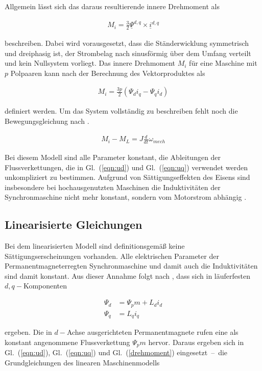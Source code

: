 \documentclass[conference,twocolumn]{IEEEtran}
\begin{document}
Allgemein lässt sich das daraus resultierende innere Drehmoment als

\begin{align}
M_i = \frac{3}{2} \underline{\Psi}^{d,q} \times \underline{i}^{d,q} \label{drehmoment}
\end{align}

beschreiben.
Dabei wird vorausgesetzt, dass die Ständerwicklung symmetrisch und dreiphasig ist, der Strombelag nach \textcite{ternesfeldkamp} sinusförmig über dem Umfang verteilt und kein Nullsystem vorliegt.
Das innere Drehmoment $M_i$ für eine Maschine mit $p$ Polpaaren kann nach der Berechnung des Vektorproduktes als

\begin{align}
M_i = \frac{3p}{2}(\Psi_d i_q - \Psi_q i_d)
\end{align}

definiert werden.
Um das System vollständig zu beschreiben fehlt noch die Bewegungsgleichung nach \textcite{mullerI2005}.

\begin{align}
M_i - M_L = J \frac{d}{dt} \omega_{mech} \label{bewegungsgleichung}
\end{align}

Bei diesem Modell sind alle Parameter konstant, die Ableitungen der Flussverkettungen, die in Gl.~(\ref{eqn:ud}) und Gl.~(\ref{eqn:uq}) verwendet werden unkompliziert zu bestimmen.
Aufgrund von Sättigungseffekten des Eisens sind insbesondere bei hochausgenutzten Maschinen die Induktivitäten der Synchronmaschine nicht mehr konstant, sondern vom Motorstrom abhängig \autocite{Kellner2012}.

\subsection{Linearisierte Gleichungen}\label{sec:lin-gleichungen}

Bei dem linearisierten Modell sind definitionsgemäß \autocite{mullerII2008} keine Sättigungserscheinungen vorhanden.
Alle elektrischen Parameter der Permanentmagneterregten Synchronmaschine und damit auch die Induktivitäten sind damit konstant.
Aus dieser Annahme folgt nach \textcite{ternesfeldkamp}, dass sich in läuferfesten $d, q-$Komponenten

\begin{align}
\Psi_d &= \Psi_pm + L_d i_d \\
\Psi_q &= L_q i_q
\end{align}

ergeben.
Die in $d-$Achse ausgerichteten Permanentmagnete rufen eine als konstant angenommene Flussverkettung $\Psi_pm$ hervor.
Daraus ergeben sich in Gl.~(\ref{eqn:ud}), Gl.~(\ref{eqn:uq}) und Gl.~(\ref{drehmoment}) eingesetzt~--~die Grundgleichungen des linearen Maschinenmodells
\end{document}
